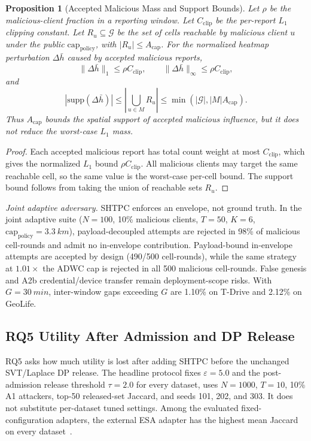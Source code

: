 \documentclass[journal]{IEEEtran}
\theoremstyle{definition}
\theoremstyle{plain}
\newtheorem{proposition}{Proposition}
\begin{document}
\begin{proposition}[Accepted Malicious Mass and Support Bounds]
  \label{prop:bounded-influence}
  Let \(\rho\) be the malicious-client fraction in a reporting window. Let
  \(C_{\mathrm{clip}}\) be the per-report \(L_1\) clipping constant. Let
  \(R_u\subseteq\mathcal{G}\) be the set of cells reachable by malicious client
  \(u\) under the public \(\mathrm{cap}_{\mathrm{policy}}\), with
  \(|R_u|\le A_{\mathrm{cap}}\). For the normalized heatmap perturbation
  \(\Delta\bar h\) caused by accepted malicious reports,
  \[
    \|\Delta\bar h\|_1\le\rho C_{\mathrm{clip}},
    \qquad
    \|\Delta\bar h\|_\infty\le\rho C_{\mathrm{clip}},
  \]
  and
  \[
    |\mathrm{supp}(\Delta\bar h)|
    \le
    \left|\bigcup_{u\in M}R_u\right|
    \le
    \min(|\mathcal{G}|,|M|A_{\mathrm{cap}}).
  \]
  Thus \(A_{\mathrm{cap}}\) bounds the spatial support of accepted malicious
  influence, but it does not reduce the worst-case \(L_1\) mass.
\end{proposition}
\begin{proof}
  Each accepted malicious report has total count weight at most
  \(C_{\mathrm{clip}}\), which gives the normalized \(L_1\) bound
  \(\rho C_{\mathrm{clip}}\). All malicious clients may target the same
  reachable cell, so the same value is the worst-case per-cell bound. The
  support bound follows from taking the union of reachable sets \(R_u\).
\end{proof}

\noindent\emph{Joint adaptive adversary.}
\textsc{SHTPC} enforces an envelope, not ground truth. In the joint adaptive
suite (\(N{=}100\), 10\% malicious clients, \(T{=}50\), \(K{=}6\),
\(\mathrm{cap}_{\mathrm{policy}}{=}\SI{3.3}{km}\)), payload-decoupled attempts
are rejected in 98\% of malicious cell-rounds and admit no in-envelope
contribution. Payload-bound in-envelope attempts are accepted by design
(490/500 cell-rounds), while the same strategy at \(1.01{\times}\) the ADWC cap
is rejected in all 500 malicious cell-rounds. False genesis and A2b
credential/device transfer remain deployment-scope risks. With
\(G{=}\SI{30}{min}\), inter-window gaps exceeding \(G\) are 1.10\% on T-Drive
and 2.12\% on GeoLife.

\subsection{RQ5 Utility After Admission and DP Release}
\label{sec:eval-utility}

RQ5 asks how much utility is lost after adding \textsc{SHTPC} before the
unchanged SVT/Laplace DP release. The headline protocol fixes
\(\varepsilon{=}5.0\) and the post-admission release threshold
\(\tau{=}2.0\) for every dataset,
uses \(N{=}1000\), \(T{=}10\), 10\% A1 attackers, top-50 released-set Jaccard,
and seeds 101, 202, and 303. It does not substitute per-dataset tuned settings.
Among the evaluated fixed-configuration adapters, the external ESA adapter has
the highest mean Jaccard on every dataset~\cite{Shamsabadi2025Nebula,
Chowdhury2022EIFFeL}.
\end{document}

